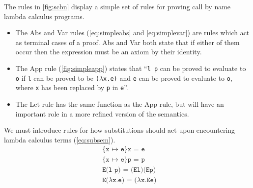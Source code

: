The rules in \autoref{fig:scbn} display a simple set of rules for proving call by name lambda calculus programs.
\begin{itemize}
\item The Abs and Var rules (\autoref{eq:simpleabs} and \autoref{eq:simplevar}) are rules which act as terminal cases of a proof.
      Abs and Var both state that if either of them occur then the expression must be an axiom by their identity.
\item The App rule (\autoref{fig:simpleapp}) states that ``\texttt{l p} can be proved to evaluate to \texttt{o} if \texttt{l} can be proved to be \texttt{($\lambda$x.e)} and \texttt{e} can be proved to evaluate to \texttt{o}, where \texttt{x} has been replaced by \texttt{p} in \texttt{e}''.
\item The Let rule has the same function as the App rule, but will have an important role in a more refined version of the semantics.
\end{itemize}
We must introduce rules for how substitutions should act upon encountering lambda calculus terms (\autoref{eq:subsem}).
\begin{align}
  &\texttt{\{x $\mapsto$ e\}x = e} \label{eq:subsem}\\
  &\texttt{\{x $\mapsto$ e\}p = p}  \tag*{}\\
  &\texttt{E(l p) = (El)(Ep)} \tag*{}\\
  &\texttt{E($\lambda$x.e) = ($\lambda$x.Ee) } \label{eq:subsemrem}%
\end{align}

